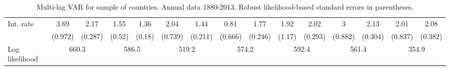\begin{table}[htbp]
\begin{tabular}{@{\extracolsep{4pt}}lcccccccccccccc@{}}
\quad Int. rate 	 &3.69 	 & 2.17 	 & 1.55 	 & 1.36 	 & 2.04 	 & 1.44 	 & 0.81 	 & 1.77 	 & 1.92 	 & 2.02 	 & 3 	 & 2.13 	 & 2.01 	 & 2.08	 \\ 
 		 & (0.972) 	 & (0.287) 	 & (0.52) 	 & (0.18) 	 & (0.739) 	 & (0.211) 	 & (0.666) 	 & (0.246) 	 & (1.17) 	 & (0.293) 	 & (0.882) 	 & (0.304) 	 & (0.837) 	 & (0.382) 	 \\ 
 \hline \rule{0pt}{4ex} 
  Log likelihood 	 &\multicolumn{2}{c}{660.3} 	 & \multicolumn{2}{c}{586.5} 	 & \multicolumn{2}{c}{519.2} 	 & \multicolumn{2}{c}{574.2} 	 & \multicolumn{2}{c}{592.4} 	 & \multicolumn{2}{c}{561.4} 	 & \multicolumn{2}{c}{354.9}\\ 

 \hline 	\end{tabular}		\caption{Multi-lag VAR for sample of countries. Annual data 1880-2013. Robust likelihood-based standard errors in parentheses.}
		\label{tab:all_4lag}

\end{table}